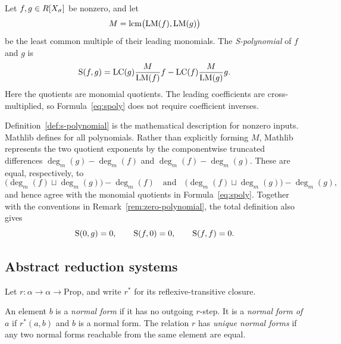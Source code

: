 \begin{definition}[S-polynomial]
\label{def:s-polynomial}
Let $f,g\in R[X_\sigma]$ be nonzero, and let
\[
  M=\operatorname{lcm}\bigl(\operatorname{LM}(f),\operatorname{LM}(g)\bigr)
\]
be the least common multiple of their leading monomials.  The
\emph{S-polynomial} of $f$ and $g$ is
\begin{equation}\label{eq:spoly}
  \operatorname{S}(f,g)
  =
  \operatorname{LC}(g)\frac{M}{\operatorname{LM}(f)}f
  -
  \operatorname{LC}(f)\frac{M}{\operatorname{LM}(g)}g.
\end{equation}
Here the quotients are monomial quotients.  The leading coefficients are
cross-multiplied, so Formula~\eqref{eq:spoly} does not require coefficient
inverses.
\end{definition}

\begin{remark}
\label{rem:spoly-total}
Definition~\ref{def:s-polynomial} is the mathematical description for
nonzero inputs.  Mathlib defines  for all
polynomials.  Rather than explicitly forming $M$, Mathlib represents the two
quotient exponents by the componentwise truncated differences
$\deg_m(g)-\deg_m(f)$ and $\deg_m(f)-\deg_m(g)$.  These are equal,
respectively, to
\[
  \bigl(\deg_m(f)\sqcup\deg_m(g)\bigr)-\deg_m(f)
  \quad\text{and}\quad
  \bigl(\deg_m(f)\sqcup\deg_m(g)\bigr)-\deg_m(g),
\]
and hence agree with the monomial quotients in
Formula~\eqref{eq:spoly}.  Together with the conventions in
Remark~\ref{rem:zero-polynomial}, the total definition also gives
\[
  \operatorname{S}(0,g)=0,\qquad
  \operatorname{S}(f,0)=0,\qquad
  \operatorname{S}(f,f)=0.
\]
\end{remark}

\subsection{Abstract reduction systems}\label{sec:abstract-reduction}

Let $r:\alpha\to\alpha\to\mathrm{Prop}$, and write $r^*$ for its
reflexive-transitive closure.

\begin{definition}
\label{def:normal-forms}
An element $b$ is a \emph{normal form} if it has no outgoing $r$-step.  It is
a \emph{normal form of $a$} if $r^*(a,b)$ and $b$ is a normal form.  The
relation $r$ has \emph{unique normal forms} if any two normal forms reachable
from the same element are equal.
\end{definition}

